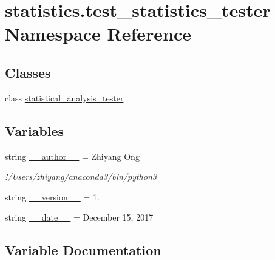 \hypertarget{namespacestatistics_1_1test__statistics__tester}{}\section{statistics.\+test\+\_\+statistics\+\_\+tester Namespace Reference}
\label{namespacestatistics_1_1test__statistics__tester}
\subsection*{Classes}
\begin{DoxyCompactItemize}
\item 
class \hyperlink{classstatistics_1_1test__statistics__tester_1_1statistical__analysis__tester}{statistical\+\_\+analysis\+\_\+tester}
\end{DoxyCompactItemize}
\subsection*{Variables}
\begin{DoxyCompactItemize}
\item 
string \hyperlink{namespacestatistics_1_1test__statistics__tester_ab9ecb1d5ecfb751c8b2a27ac138a0eed}{\+\_\+\+\_\+author\+\_\+\+\_\+} = \textquotesingle{}Zhiyang Ong\textquotesingle{}
\begin{DoxyCompactList}\small\item\em !/\+Users/zhiyang/anaconda3/bin/python3 \end{DoxyCompactList}\item 
string \hyperlink{namespacestatistics_1_1test__statistics__tester_a29677162e8392e196da563156d924f5d}{\+\_\+\+\_\+version\+\_\+\+\_\+} = \textquotesingle{}1.\textquotesingle{}
\item 
string \hyperlink{namespacestatistics_1_1test__statistics__tester_a0d2103581aebe4f7dfb05775432fa386}{\+\_\+\+\_\+date\+\_\+\+\_\+} = \textquotesingle{}December 15, 2017\textquotesingle{}
\end{DoxyCompactItemize}


\subsection{Variable Documentation}
\hypertarget{namespacestatistics_1_1test__statistics__tester_ab9ecb1d5ecfb751c8b2a27ac138a0eed}{}
